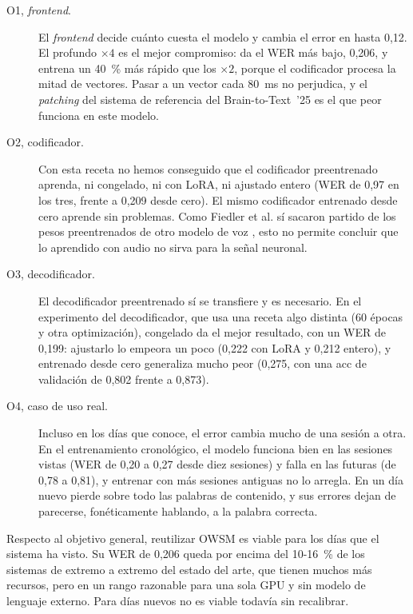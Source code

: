 \begin{description}
  \item[O1, \textit{frontend}.] El \textit{frontend} decide cuánto cuesta el modelo y cambia el error en hasta 0,12. El profundo $\times 4$ es el mejor compromiso: da el WER más bajo, 0,206, y entrena un 40~\% más rápido que los $\times 2$, porque el codificador procesa la mitad de vectores. Pasar a un vector cada 80~ms no perjudica, y el \textit{patching} del sistema de referencia del Brain-to-Text~'25 es el que peor funciona en este modelo.
  \item[O2, codificador.] Con esta receta no hemos conseguido que el codificador preentrenado aprenda, ni congelado, ni con LoRA, ni ajustado entero (WER de 0,97 en los tres, frente a 0,209 desde cero). El mismo codificador entrenado desde cero aprende sin problemas. Como Fiedler et al. sí sacaron partido de los pesos preentrenados de otro modelo de voz \cite{fiedler2025wav2vec2brain}, esto no permite concluir que lo aprendido con audio no sirva para la señal neuronal.
  \item[O3, decodificador.] El decodificador preentrenado sí se transfiere y es necesario. En el experimento del decodificador, que usa una receta algo distinta (60 épocas y otra optimización), congelado da el mejor resultado, con un WER de 0,199: ajustarlo lo empeora un poco (0,222 con LoRA y 0,212 entero), y entrenado desde cero generaliza mucho peor (0,275, con una acc de validación de 0,802 frente a 0,873).
  \item[O4, caso de uso real.] Incluso en los días que conoce, el error cambia mucho de una sesión a otra. En el entrenamiento cronológico, el modelo funciona bien en las sesiones vistas (WER de 0,20 a 0,27 desde diez sesiones) y falla en las futuras (de 0,78 a 0,81), y entrenar con más sesiones antiguas no lo arregla. En un día nuevo pierde sobre todo las palabras de contenido, y sus errores dejan de parecerse, fonéticamente hablando, a la palabra correcta.
\end{description}

Respecto al objetivo general, reutilizar OWSM es viable para los días que el sistema ha visto. Su WER de 0,206 queda por encima del 10-16~\% de los sistemas de extremo a extremo del estado del arte, que tienen muchos más recursos, pero en un rango razonable para una sola GPU y sin modelo de lenguaje externo. Para días nuevos no es viable todavía sin recalibrar.

